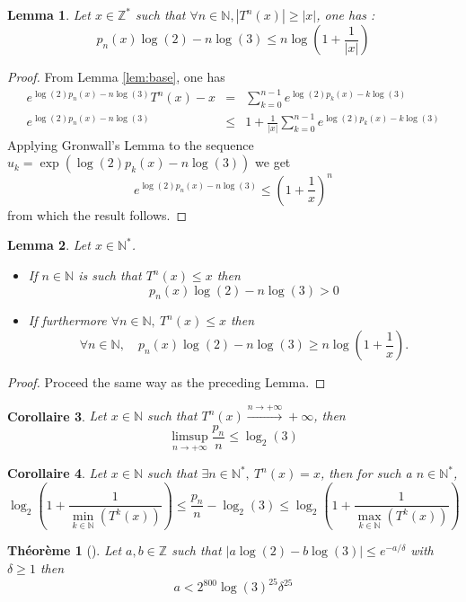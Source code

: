 \documentclass[12pt,a4paper]{article}
\newtheorem{lem}{Lemma}[section]
\newtheorem{cor}[lem]{Corollaire}
\newtheorem{theo}{Théorème}
\def\NN{\mathbb{N}}
\def\ZZ{\mathbb{Z}}
\begin{document}
\begin{lem} Let $x\in \ZZ^*$ such that $\forall n\in\NN, |T^n(x)|\geq |x|$, one has : $$p_n(x) \log(2) - n \log(3)\leq n\log\left(1+ \frac{1}{|x|}\right)  $$
\end{lem}
\begin{proof}
From Lemma \ref{lem:base}, one has 
\begin{eqnarray*}
e^{\log(2)p_n(x)-n\log(3)}T^n(x) - x &=& \sum_{k=0}^{n-1} e^{\log(2)p_k(x)-k\log(3)}
\\
e^{\log(2)p_n(x)-n\log(3)}&\leq &1+\frac{1}{|x|} \sum_{k=0}^{n-1} e^{\log(2)p_k(x)-k\log(3)}
\end{eqnarray*}
Applying Gronwall's Lemma to the sequence $u_k = \exp\left(\log(2)p_k(x)-n\log(3)\right)$ we get 
$$ e^{\log(2)p_n(x)-n\log(3)} \leq \left(1+\frac{1}{x}\right)^n$$
from which the result follows.
\end{proof}
\begin{lem} Let $x\in \NN^*$.

\begin{itemize}
\item If $n\in\NN$ is such that $T^n(x)\leq x$ then 
$$p_n(x)\log(2)-n\log(3) >0$$ 
\item If furthermore $\forall n\in\NN,~T^n(x)\leq x $ then $$\forall n\in \NN,\quad  p_n(x)\log(2)-n\log(3) \geq n \log\left(1+\frac{1}{x} \right).$$ 
\end{itemize}


\end{lem}
\begin{proof}
Proceed the same way as the preceding Lemma.
\end{proof}
\begin{cor} Let $x\in \NN$ such that $T^n(x) \xrightarrow{n\rightarrow +\infty} +\infty$, then $$\limsup_{n\rightarrow+\infty} \frac{p_n}{n}\leq \log_2(3) $$
\end{cor}
\begin{cor}\label{cor:bounds} Let $x\in \NN$ such that $\exists n\in \NN^*,~ T^n(x) = x$, then for such a $n\in \NN^*$, $$\log_2\left(1+\frac{1}{\min_{k\in \NN}(T^k(x))}\right)  \leq \frac{p_n}{n}-\log_2(3)\leq  \log_2\left(1+\frac{1}{\max_{k\in \NN}(T^k(x))}\right) $$
\end{cor}

\begin{theo}[\cite{MR1074572}]
Let $a,b\in \ZZ$ such that $|a\log(2)-b\log(3)|\leq e^{-a/\delta}$ with $\delta \geq 1$ then 
$$a < 2^{800}\log(3)^{25}\delta^{25} $$
\end{theo}
\end{document}
